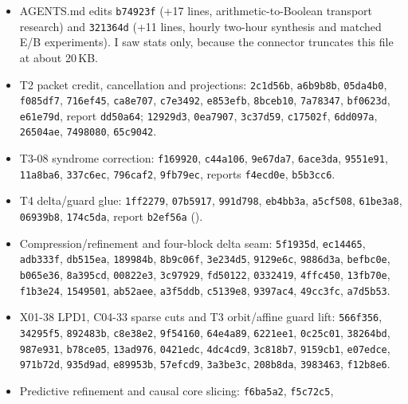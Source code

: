 \documentclass[11pt]{article}
\theoremstyle{definition}
\theoremstyle{remark}
\begin{document}
\begin{itemize}
\item AGENTS.md edits \texttt{b74923f} (+17 lines, arithmetic-to-Boolean transport research)
and \texttt{321364d} (+11 lines, hourly two-hour synthesis and matched E/B experiments). I saw
stats only, because the connector truncates this file at about 20\,KB.
\item T2 packet credit, cancellation and projections: \texttt{2c1d56b}, \texttt{a6b9b8b},
\texttt{05da4b0}, \texttt{f085df7}, \texttt{716ef45}, \texttt{ca8e707}, \texttt{c7e3492},
\texttt{e853efb}, \texttt{8bceb10}, \texttt{7a78347}, \texttt{bf0623d}, \texttt{e61e79d},
report \texttt{dd50a64}; \texttt{12929d3}, \texttt{0ea7907}, \texttt{3c37d59},
\texttt{c17502f}, \texttt{6dd097a}, \texttt{26504ae}, \texttt{7498080}, \texttt{65c9042}.
\item T3-08 syndrome correction: \texttt{f169920}, \texttt{c44a106}, \texttt{9e67da7},
\texttt{6ace3da}, \texttt{9551e91}, \texttt{11a8ba6}, \texttt{337c6ec}, \texttt{796caf2},
\texttt{9fb79ec}, reports \texttt{f4ecd0e}, \texttt{b5b3cc6}.
\item T4 delta/guard glue: \texttt{1ff2279}, \texttt{07b5917}, \texttt{991d798},
\texttt{eb4bb3a}, \texttt{a5cf508}, \texttt{61be3a8}, \texttt{06939b8}, \texttt{174c5da},
report \texttt{b2ef56a}
().
\item Compression/refinement and four-block delta seam: \texttt{5f1935d}, \texttt{ec14465},
\texttt{adb333f}, \texttt{db515ea}, \texttt{189984b}, \texttt{8b9c06f}, \texttt{3e234d5},
\texttt{9129e6c}, \texttt{9886d3a}, \texttt{befbc0e}, \texttt{b065e36}, \texttt{8a395cd},
\texttt{00822e3}, \texttt{3c97929}, \texttt{fd50122}, \texttt{0332419}, \texttt{4ffc450},
\texttt{13fb70e}, \texttt{f1b3e24}, \texttt{1549501}, \texttt{ab52aee}, \texttt{a3f5ddb},
\texttt{c5139e8}, \texttt{9397ac4}, \texttt{49cc3fc}, \texttt{a7d5b53}.
\item X01-38 LPD1, C04-33 sparse cuts and T3 orbit/affine guard lift: \texttt{566f356},
\texttt{34295f5}, \texttt{892483b}, \texttt{c8e38e2}, \texttt{9f54160}, \texttt{64e4a89},
\texttt{6221ee1}, \texttt{0c25c01}, \texttt{38264bd}, \texttt{987e931}, \texttt{b78ce05},
\texttt{13ad976}, \texttt{0421edc}, \texttt{4dc4cd9}, \texttt{3c818b7}, \texttt{9159cb1},
\texttt{e07edce}, \texttt{971b72d}, \texttt{935d9ad}, \texttt{e89953b}, \texttt{57efcd9},
\texttt{3a3be3c}, \texttt{208b8da}, \texttt{3983463}, \texttt{f12b8e6}.
\item Predictive refinement and causal core slicing: \texttt{f6ba5a2}, \texttt{f5c72c5},

\end{itemize}
\end{document}
